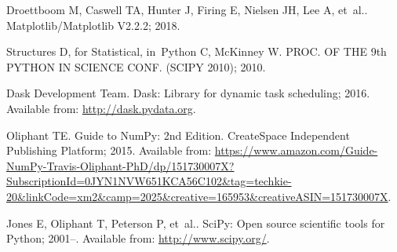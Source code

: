 \documentclass[10pt,letterpaper]{article}
\begin{document}
\begin{thebibliography}{10}
Droettboom M, Caswell TA, Hunter J, Firing E, Nielsen JH, Lee A, et~al..
  Matplotlib/Matplotlib V2.2.2; 2018.

Structures D, for Statistical, in~Python C, McKinney W.
\newblock PROC. OF THE 9th PYTHON IN SCIENCE CONF. (SCIPY 2010); 2010.

{Dask Development Team}. Dask: Library for dynamic task scheduling; 2016.
\newblock Available from: \url{http://dask.pydata.org}.

Oliphant TE.
\newblock Guide to NumPy: 2nd Edition.
\newblock CreateSpace Independent Publishing Platform; 2015.
\newblock Available from:
  \url{https://www.amazon.com/Guide-NumPy-Travis-Oliphant-PhD/dp/151730007X?SubscriptionId=0JYN1NVW651KCA56C102&tag=techkie-20&linkCode=xm2&camp=2025&creative=165953&creativeASIN=151730007X}.

Jones E, Oliphant T, Peterson P, et~al.. {SciPy}: Open source scientific tools
  for {Python}; 2001--.
\newblock Available from: \url{http://www.scipy.org/}.

\end{thebibliography}
\end{document}
